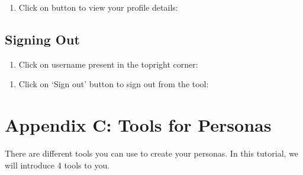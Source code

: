\documentclass[letterpaper,10pt,english]{jupyterBook}
\begin{document}
\sphinxAtStartPar
{}
\begin{enumerate}
%
\item {} 
\sphinxAtStartPar
Click on  button to view your profile details:

\end{enumerate}

\sphinxAtStartPar
{}


\section{Signing Out}
\label{\detokenize{appendices/appendix_b/motivational_model_guide:signing-out}}\begin{enumerate}
%
\item {} 
\sphinxAtStartPar
Click on username present in the top\sphinxhyphen{}right corner:

\end{enumerate}

\sphinxAtStartPar
{}
\begin{enumerate}
%
\item {} 
\sphinxAtStartPar
Click on ‘Sign out’ button to sign out from the tool:

\end{enumerate}

\sphinxAtStartPar
{}


\chapter{Appendix C: Tools for Personas}
\label{\detokenize{appendices/appendix_c/personas_guide:appendix-c-tools-for-personas}}\label{\detokenize{appendices/appendix_c/personas_guide::doc}}
\sphinxAtStartPar
There are different tools you can use to create your personas. In this tutorial, we will introduce 4 tools to you.
\end{document}
